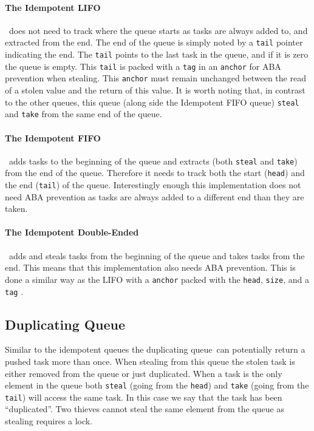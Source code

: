 \paragraph{The Idempotent LIFO}\,\cite[p. 47]{Michael:2009:IWS:1594835.1504186} does not need to track where the queue starts as tasks are always added to, and extracted from the end. The end of the queue is simply noted by a \texttt{tail} pointer indicating the end. The \texttt{tail} points to the last task in the queue, and if it is zero the queue is empty. This \texttt{tail} is packed with a \texttt{tag} in an \texttt{anchor} for ABA prevention when stealing. This \texttt{anchor} must remain unchanged between the read of a stolen value and the return of this value. It is worth noting that, in contrast to the other queues, this queue (along side the Idempotent FIFO queue) \texttt{steal} and \texttt{take} from the same end of the queue.

\paragraph{The Idempotent FIFO}\,\cite[p. 48]{Michael:2009:IWS:1594835.1504186}  adds tasks to the beginning of the queue and extracts (both \texttt{steal} and \texttt{take}) from the end of the queue. Therefore it needs to track both the start (\texttt{head}) and the end (\texttt{tail}) of the queue. Interestingly enough this implementation does not need ABA prevention as tasks are always added to a different end than they are taken.

\paragraph{The Idempotent Double-Ended} \,\cite[p. 49]{Michael:2009:IWS:1594835.1504186} adds and steals tasks from the beginning of the queue and takes tasks from the end. This means that this implementation also needs ABA prevention. This is done a similar way as the LIFO with a \texttt{anchor} packed with the \texttt{head}, \texttt{size}, and a \texttt{tag} .

\subsection{Duplicating Queue}
Similar to the idempotent queues the duplicating queue\,\cite[p. 233]{Leijen:2009:DTP:1639949.1640106} can potentially return a pushed task more than once. When stealing from this queue the stolen task is either removed from the queue or just duplicated. When a task is the only element in the queue both \texttt{steal} (going from the \texttt{head}) and \texttt{take} (going from the \texttt{tail}) will access the same task. In this case we say that the task has been ``duplicated''. Two thieves cannot steal the same element from the queue as stealing requires a lock.

